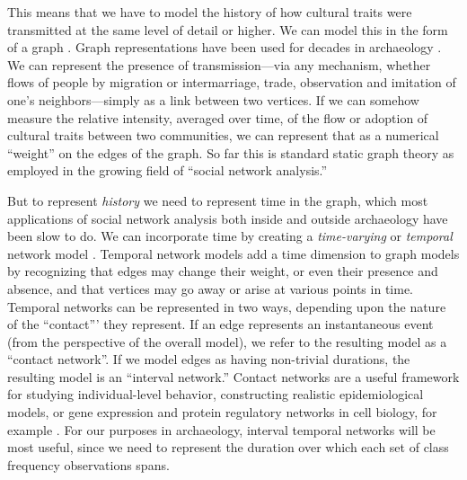     This means that we have to model the history of how cultural traits were transmitted at the same level of detail or higher.  We can model this in the form of a graph \citep{diestel2010graph,Harary1969}.  Graph representations have been used for decades in archaeology . We can represent the presence of transmission---via any mechanism, whether flows of people by migration or intermarriage, trade, observation and imitation of one's neighbors---simply as a link between two vertices.  If we can somehow measure the relative intensity, averaged over time, of the flow or adoption of cultural traits between two communities, we can represent that as a numerical ``weight'' on the edges of the graph.  So far this is standard static graph theory as employed in the growing field of ``social network analysis.''  
    
    But to represent \emph{history} we need to represent time in the graph, which most applications of social network analysis both inside and outside archaeology have been slow to do.  We can incorporate time by creating a \emph{time-varying} or \emph{temporal} network model \citep{Holme2012}.  Temporal network models add a time dimension to graph models by recognizing that edges may change their weight, or even their presence and absence, and that vertices may go away or arise at various points in time.  Temporal networks can be represented in two ways, depending upon the nature of the ``contact''' they represent.  If an edge represents an instantaneous event (from the perspective of the overall model), we refer to the resulting model as a ``contact network''.  If we model edges as having non-trivial durations, the resulting model is an ``interval network.''  Contact networks are a useful framework for studying individual-level behavior, constructing realistic epidemiological models, or gene expression and protein regulatory networks in cell biology, for example \citep{Holme2012}.  For our purposes in archaeology, interval temporal networks will be most useful, since we need to represent the duration over which each set of class frequency observations spans.  
    
